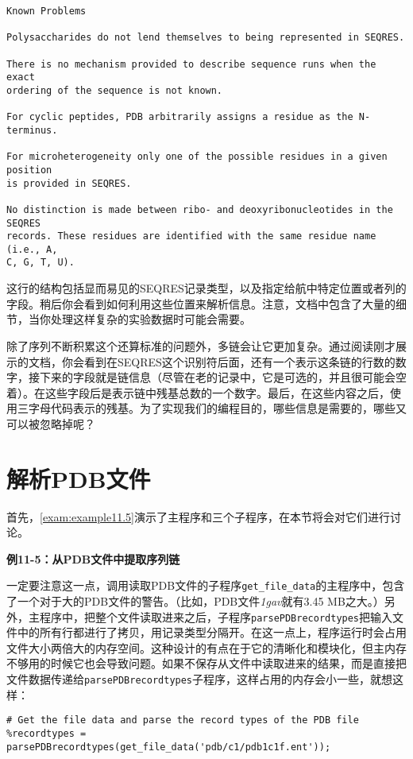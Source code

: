 \begin{lstlisting}
Known Problems 

Polysaccharides do not lend themselves to being represented in SEQRES. 

There is no mechanism provided to describe sequence runs when the exact
ordering of the sequence is not known. 

For cyclic peptides, PDB arbitrarily assigns a residue as the N-terminus. 

For microheterogeneity only one of the possible residues in a given position
is provided in SEQRES. 

No distinction is made between ribo- and deoxyribonucleotides in the SEQRES
records. These residues are identified with the same residue name (i.e., A,
C, G, T, U). 
\end{lstlisting}

这行的结构包括显而易见的SEQRES记录类型，以及指定给航中特定位置或者列的字段。稍后你会看到如何利用这些位置来解析信息。注意，文档中包含了大量的细节，当你处理这样复杂的实验数据时可能会需要。

除了序列不断积累这个还算标准的问题外，多链会让它更加复杂。通过阅读刚才展示的文档，你会看到在SEQRES这个识别符后面，还有一个表示这条链的行数的数字，接下来的字段就是链信息（尽管在老的记录中，它是可选的，并且很可能会空着）。在这些字段后是表示链中残基总数的一个数字。最后，在这些内容之后，使用三字母代码表示的残基。为了实现我们的编程目的，哪些信息是需要的，哪些又可以被忽略掉呢？

\section{解析PDB文件}
首先，\autoref{exam:example11.5}演示了主程序和三个子程序，在本节将会对它们进行讨论。

\textbf{例11-5：从PDB文件中提取序列链}


一定要注意这一点，调用读取PDB文件的子程序\verb|get_file_data|的主程序中，包含了一个对于大的PDB文件的警告。（比如，PDB文件\textit{1gav}就有3.45
MB之大。）另外，主程序中，把整个文件读取进来之后，子程序\verb|parsePDBrecordtypes|把输入文件中的所有行都进行了拷贝，用记录类型分隔开。在这一点上，程序运行时会占用文件大小两倍大的内存空间。这种设计的有点在于它的清晰化和模块化，但主内存不够用的时候它也会导致问题。如果不保存从文件中读取进来的结果，而是直接把文件数据传递给\verb|parsePDBrecordtypes|子程序，这样占用的内存会小一些，就想这样：

\begin{lstlisting}
# Get the file data and parse the record types of the PDB file
%recordtypes = parsePDBrecordtypes(get_file_data('pdb/c1/pdb1c1f.ent'));
\end{lstlisting}

